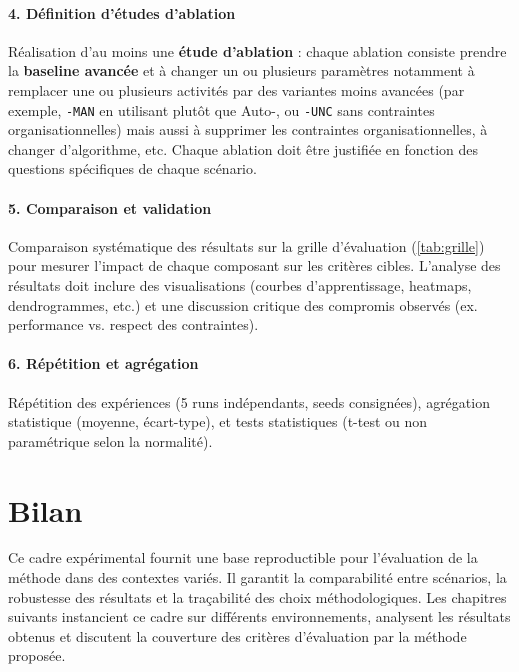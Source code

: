 \paragraph{4. Définition d’études d’ablation}
Réalisation d’au moins une \textbf{étude d’ablation} : chaque ablation consiste prendre la \textbf{baseline avancée} et à changer un ou plusieurs paramètres notamment à remplacer une ou plusieurs activités  par des variantes moins avancées (par exemple, \texttt{-MAN} en utilisant  plutôt que Auto-, ou \texttt{-UNC} sans contraintes organisationnelles) mais aussi à supprimer les contraintes organisationnelles, à changer d’algorithme, etc. Chaque ablation doit être justifiée en fonction des questions spécifiques de chaque scénario.

\paragraph{5. Comparaison et validation}
Comparaison systématique des résultats sur la grille d’évaluation (\autoref{tab:grille}) pour mesurer l’impact de chaque composant sur les critères cibles. L'analyse des résultats doit inclure des visualisations (courbes d’apprentissage, heatmaps, dendrogrammes, etc.) et une discussion critique des compromis observés (ex. performance vs. respect des contraintes).

\paragraph{6. Répétition et agrégation}
Répétition des expériences (5 runs indépendants, seeds consignées), agrégation statistique (moyenne, écart-type), et tests statistiques (t-test ou non paramétrique selon la normalité).


\section*{Bilan}

Ce cadre expérimental fournit une base reproductible pour l’évaluation de la méthode  dans des contextes variés. Il garantit la comparabilité entre scénarios, la robustesse des résultats et la traçabilité des choix méthodologiques. Les chapitres suivants instancient ce cadre sur différents environnements, analysent les résultats obtenus et discutent la couverture des critères d’évaluation par la méthode proposée.


\clearpage
\thispagestyle{empty}
\null
\newpage


